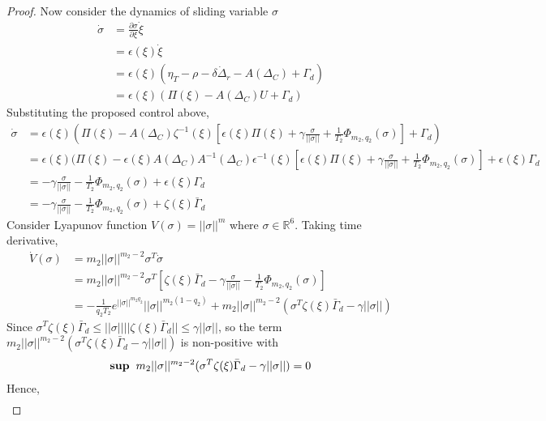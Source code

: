 \documentclass[]{article}
\theoremstyle{remark}
\theoremstyle{definition}
\begin{document}
\begin{proof}
	Now consider the dynamics of sliding variable $ \sigma $ 
	\begin{align}
		\dot \sigma  &= \frac{\partial \sigma}{\partial \xi}\dot \xi \\
		& = \epsilon(\xi)\dot \xi \\
		& = \epsilon(\xi)(\eta_T-\rho-\delta\dot\Delta_r-A(\Delta_C)+\Gamma_d)\\
		&= \epsilon(\xi)(\Pi(\xi)-A(\Delta_C)U+ \Gamma_d) 
	\end{align}
Substituting the proposed control above,
\begin{align}
	\dot \sigma &= \epsilon(\xi)(\Pi(\xi)-A(\Delta_C)\zeta^{-1}(\xi)\left[\epsilon(\xi)\Pi(\xi)+ \gamma \frac{\sigma}{||\sigma||} + \frac{1}{T_2}\Phi_{m_2,q_2}(\sigma)\right]+ \Gamma_d) \\
	& = \epsilon(\xi)(\Pi(\xi) - \epsilon(\xi)A(\Delta_C)A^{-1}(\Delta_C)\epsilon^{-1}(\xi)\left[\epsilon(\xi)\Pi(\xi)+ \gamma \frac{\sigma}{||\sigma||} + \frac{1}{T_2}\Phi_{m_2,q_2}(\sigma)\right]+ \epsilon(\xi)\Gamma_d \\
	& = -\gamma \frac{\sigma}{||\sigma||} - \frac{1}{T_2}\Phi_{m_2,q_2}(\sigma)+ \epsilon(\xi)\Gamma_d \\
	& = -\gamma \frac{\sigma}{||\sigma||} - \frac{1}{T_2}\Phi_{m_2,q_2}(\sigma)+ \zeta(\xi)\bar\Gamma_d
\end{align}
Consider Lyapunov function $ V(\sigma) = ||\sigma||^m $ where $ \sigma\in \mathbb{R}^6$.
Taking time derivative,
\begin{align}
	\dot V(\sigma) &= m_2||\sigma||^{m_2-2}\sigma^T\dot \sigma \\
	& = m_2||\sigma||^{m_2-2}\sigma^T\left[\zeta(\xi)\bar\Gamma_d-\gamma \frac{\sigma}{||\sigma||} - \frac{1}{T_2}\Phi_{m_2,q_2}(\sigma)\right]\\
	& = -\frac{1}{q_2T_2}e^{||\sigma||^{m_2q_2}}||\sigma||^{m_2(1-q_2)} + m_2||\sigma||^{m_2-2}(\sigma^T\zeta(\xi)\bar\Gamma_d -\gamma||\sigma||)
	\end {align}
	Since $\sigma^T\zeta(\xi)\bar\Gamma_d\leq ||\sigma||||\zeta(\xi)\bar\Gamma_d||\leq \gamma||\sigma||$, so the term $m_2||\sigma||^{m_2-2}(\sigma^T\zeta(\xi)\bar\Gamma_d -\gamma||\sigma||)$ is non-positive with 
	\begin{align}
		\textbf{sup} \hspace{2mm}m_2||\sigma||^{m_2-2}(\sigma^T\zeta(\xi)\bar\Gamma_d -\gamma||\sigma||) = 0 
	\end{align}
	Hence,
	\begin{align}

\end{align}
\end{proof}
\end{document}
